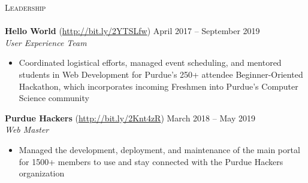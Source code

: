 \documentclass[letterpaper, 10pt]{article}
\newcommand{\lineunder} {
    \vspace*{-8pt} \\
    \hspace*{-18pt} \hrulefill \\
}
\newcommand{\header} [1] {
    {
        \hspace*{-18pt}\vspace*{6pt}
        {\large\textsc{#1}}
    }
    \vspace*{-6pt} \lineunder
}
\begin{document}
\header{Leadership}

{\textbf{Hello World}} (\href{http://bit.ly/2YTSLfw}{http://bit.ly/2YTSLfw}) \hfill April 2017 -- September 2019\\
\textit{User Experience Team}\\
\vspace{-1mm}
\begin{itemize} \itemsep 1pt
	\item Coordinated logistical efforts, managed event scheduling, and mentored students in Web Development for Purdue’s 250+ attendee Beginner-Oriented Hackathon, which incorporates incoming Freshmen into Purdue’s Computer Science community
\end{itemize}

\textbf{Purdue Hackers} (\href{http://bit.ly/2Knt4zR}{http://bit.ly/2Knt4zR})
\hfill March 2018 -- May 2019\\
\textit{Web Master}\\
\vspace{-1mm}
\begin{itemize} \itemsep 1pt
	\item Managed the development, deployment, and maintenance of the main portal for 1500+ members to use and stay connected with the Purdue Hackers organization
\end{itemize}

\vspace*{2mm}

\
\end{document}
